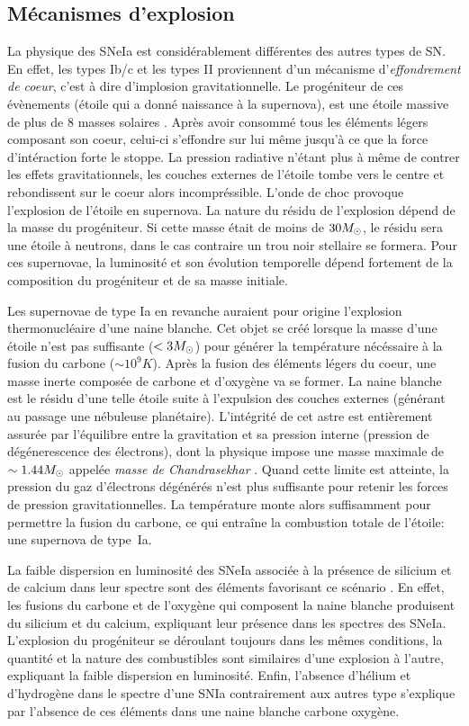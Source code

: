 \documentclass[../main/main.tex]{subfiles}
\begin{document}
\subsection{Mécanismes d'explosion}
La physique des SNeIa est considérablement différentes des autres types
de SN. En effet, les types Ib/c et les types II proviennent d'un
mécanisme d'\textit{effondrement de coeur}, c'est à dire d'implosion
gravitationnelle. Le progéniteur de ces évènements (étoile qui a donné
naissance à la supernova), est une étoile massive de plus de $8$ masses solaires
\citep{Heger2003}. Après avoir consommé tous les éléments légers
composant son coeur, celui-ci s'effondre sur lui même jusqu'à ce que la
force d'intéraction forte le stoppe. La pression radiative n'étant plus
à même de contrer les effets gravitationnels, les couches externes de
l'étoile tombe vers le centre et rebondissent sur le coeur alors
incompréssible. L'onde de choc provoque l'explosion de l'étoile en
supernova.
La nature du résidu de l'explosion dépend de la masse du progéniteur. Si
cette masse était de moins de $30M_{\odot}$, le résidu sera une étoile à
neutrons, dans le cas contraire un trou noir stellaire se formera.
Pour ces supernovae, la luminosité et son évolution temporelle dépend
fortement de la composition du progéniteur et de sa masse
initiale. 

Les supernovae de type Ia en revanche auraient pour origine l'explosion
thermonucléaire d'une naine blanche. Cet objet se créé lorsque la masse d'une étoile n'est pas
suffisante ($<3M_{\odot}$) pour générer la température nécéssaire à la
fusion du carbone ($\sim10^{9}K$). Après la fusion des éléments
légers du coeur, une masse inerte composée de carbone et d'oxygène va se
former. La naine blanche est le résidu d'une telle étoile suite à l'expulsion des couches externes (générant au passage une
nébuleuse planétaire).
L'intégrité de cet astre est entièrement assurée par l'équilibre entre
la gravitation et sa pression interne (pression de dégénerescence des
électrons), dont la physique impose une masse maximale de
$\sim1.44M_{\odot}$ appelée \textit{masse de Chandrasekhar} \citep{Chandrasekhar}.
Quand cette limite est atteinte, la pression du gaz d'électrons
dégénérés n'est plus suffisante pour retenir les forces de pression
gravitationnelles. La température monte alors suffisamment pour
permettre la fusion du carbone, ce qui entraîne la combustion totale de
l'étoile: une supernova de type~Ia.

La faible dispersion en luminosité
des SNeIa associée à la présence de silicium et de calcium dans leur spectre
sont des éléments favorisant ce scénario \citep{Hoyle1960}. En effet,
les fusions du carbone et de l'oxygène qui composent la naine blanche
produisent du silicium et du calcium, expliquant leur présence dans les
spectres des SNeIa. L'explosion du progéniteur se déroulant toujours
dans les mêmes conditions, la quantité et la nature des combustibles sont
similaires d'une explosion à l'autre, expliquant la faible dispersion en
luminosité. Enfin, l'absence d'hélium et d'hydrogène dans le spectre
d'une SNIa contrairement aux autres type s'explique par l'absence de ces
éléments dans une naine blanche carbone oxygène.
\end{document}
